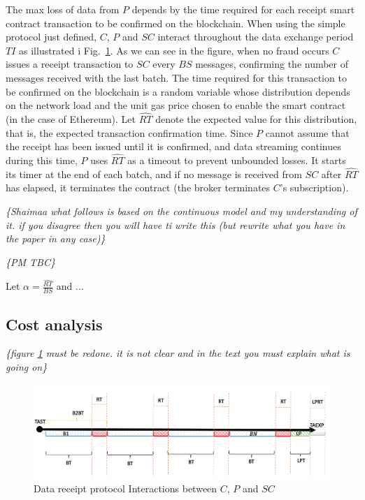 \documentclass[letterpaper, 10 pt, conference]{ieeeconf}  %
\newcommand{\anote}[1]{{\leavevmode\smaller\itshape\color{red}\{#1\}}}
\newcommand{\bs}{\ensuremath{\mathit{BS}}}
\newcommand{\ti}{\ensuremath{\mathit{TI}}}
\newcommand{\smartc}{\ensuremath{\mathit{SC}}}
\newcommand{\rtEst}{\ensuremath{\widehat{\mathit{RT}}}}
\begin{document}
The max loss of data from $P$ depends by the time required for each receipt smart contract transaction to be confirmed on the blockchain.
When using the simple protocol just defined, $C$, $P$ and \smartc{} interact throughout the data exchange period \ti{} as illustrated i Fig.~\ref{fig:batching}.
As we can see in the figure, when no fraud occurs $C$ issues a receipt transaction to \smartc{} every \bs{} messages, confirming the number of messages received with the last batch. 
The time required for this transaction to be confirmed on the blockchain is a random variable whose distribution depends on the network load and the unit gas price chosen to enable the smart contract (in the case of Ethereum). 
Let \rtEst{} denote the expected value for this distribution, that is, the expected transaction confirmation time.
Since $P$ cannot assume that the receipt has been issued until it is confirmed, and data streaming continues during this time, $P$ uses \rtEst{} as a timeout to prevent unbounded losses.
It starts its timer at the end of each batch, and if no message is received from \smartc{} after \rtEst{} has elapsed, it terminates the contract (the broker terminates $C$'s subscription).

\anote{Shaimaa what follows is based on the continuous model and my understanding of it. if you disagree then you will have ti write this  (but rewrite what you have in the paper in any case)}


\anote{PM TBC}

Let $\alpha = \frac{\rtEst}{\bs}$ and ...



\subsection{Cost analysis}  \label{sec:cost}

\anote{figure \ref{fig:batching} must be redone. it is not clear and in the text you must explain what is going on}

\begin{figure}
	\caption{Data receipt protocol Interactions between $C$, $P$ and \smartc{}}
	\label{fig:batching}
	\includegraphics[scale=0.25]{Dis}
	\centering
\end{figure}
\end{document}
